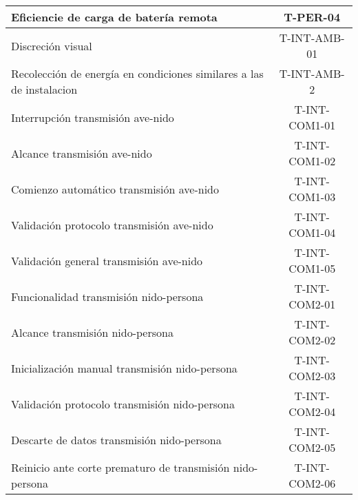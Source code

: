 \begin{table}[H]
\begin{tabular}{|l|c|}
Eficiencie de carga de batería remota                                                                                & T-PER-04             \\ \hline
Discreción visual                                                                                                    & T-INT-AMB-01         \\ \hline
Recolección de energía en condiciones similares a las de instalacion                                                 & T-INT-AMB-2          \\ \hline
Interrupción transmisión ave-nido                                                                                    & T-INT-COM1-01        \\ \hline
Alcance transmisión ave-nido                                                                                         & T-INT-COM1-02        \\ \hline
Comienzo automático transmisión ave-nido                                                                             & T-INT-COM1-03        \\ \hline
Validación protocolo transmisión ave-nido                                                                            & T-INT-COM1-04        \\ \hline
Validación general transmisión ave-nido                                                                              & T-INT-COM1-05        \\ \hline
Funcionalidad transmisión nido-persona                                                                               & T-INT-COM2-01        \\ \hline
Alcance transmisión nido-persona                                                                                     & T-INT-COM2-02        \\ \hline
Inicialización manual transmisión nido-persona                                                                       & T-INT-COM2-03        \\ \hline
Validación protocolo transmisión nido-persona                                                                        & T-INT-COM2-04        \\ \hline
Descarte de datos transmisión nido-persona                                                                           & T-INT-COM2-05        \\ \hline
Reinicio ante corte prematuro de transmisión nido-persona                                                            & T-INT-COM2-06        \\ \hline

\end{tabular}
\end{table}
